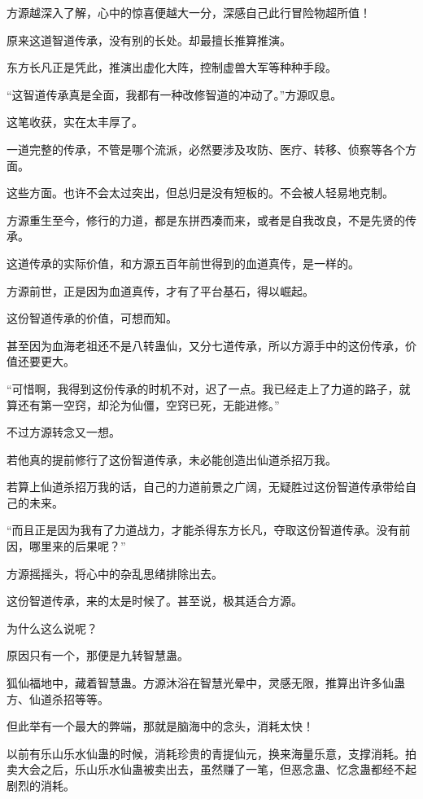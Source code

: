 \begin{this_body}
方源越深入了解，心中的惊喜便越大一分，深感自己此行冒险物超所值！

原来这道智道传承，没有别的长处。却最擅长推算推演。

东方长凡正是凭此，推演出虚化大阵，控制虚兽大军等种种手段。

“这智道传承真是全面，我都有一种改修智道的冲动了。”方源叹息。

这笔收获，实在太丰厚了。

一道完整的传承，不管是哪个流派，必然要涉及攻防、医疗、转移、侦察等各个方面。

这些方面。也许不会太过突出，但总归是没有短板的。不会被人轻易地克制。

方源重生至今，修行的力道，都是东拼西凑而来，或者是自我改良，不是先贤的传承。

这道传承的实际价值，和方源五百年前世得到的血道真传，是一样的。

方源前世，正是因为血道真传，才有了平台基石，得以崛起。

这份智道传承的价值，可想而知。

甚至因为血海老祖还不是八转蛊仙，又分七道传承，所以方源手中的这份传承，价值还要更大。

“可惜啊，我得到这份传承的时机不对，迟了一点。我已经走上了力道的路子，就算还有第一空窍，却沦为仙僵，空窍已死，无能进修。”

不过方源转念又一想。

若他真的提前修行了这份智道传承，未必能创造出仙道杀招万我。

若算上仙道杀招万我的话，自己的力道前景之广阔，无疑胜过这份智道传承带给自己的未来。

“而且正是因为我有了力道战力，才能杀得东方长凡，夺取这份智道传承。没有前因，哪里来的后果呢？”

方源摇摇头，将心中的杂乱思绪排除出去。

这份智道传承，来的太是时候了。甚至说，极其适合方源。

为什么这么说呢？

原因只有一个，那便是九转智慧蛊。

狐仙福地中，藏着智慧蛊。方源沐浴在智慧光晕中，灵感无限，推算出许多仙蛊方、仙道杀招等等。

但此举有一个最大的弊端，那就是脑海中的念头，消耗太快！

以前有乐山乐水仙蛊的时候，消耗珍贵的青提仙元，换来海量乐意，支撑消耗。拍卖大会之后，乐山乐水仙蛊被卖出去，虽然赚了一笔，但恶念蛊、忆念蛊都经不起剧烈的消耗。


\end{this_body}
